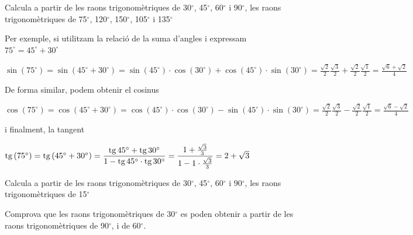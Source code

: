 \begin{mylist}
	\exer
	Calcula a partir de les raons trigonomètriques de
	30${}^\circ$, 45${}^\circ$, 60${}^\circ$ i
	90${}^\circ$, les raons trigonomètriques de
	75${}^\circ$, 120${}^\circ$, 150${}^\circ$, 
	105${}^\circ$ i 135${}^\circ$
	
	\begin{example}[*]
		Per exemple, si utilitzam la relació de la suma d'angles i expressam $75^\circ =45^\circ + 30^\circ$
		
		$\sin(75^\circ)=\sin(45^\circ + 30^\circ)=\sin(45^\circ)\cdot \cos(30^\circ) + \cos(45^\circ)\cdot \sin(30^\circ)=\frac{\sqrt{2}}{2}\frac{\sqrt{3}}{2}+\frac{\sqrt{2}}{2}\frac{\sqrt{1}}{2}=\frac{\sqrt{6}+\sqrt{2}}{4}$
	\end{example}
	
	\begin{example}[*]	
		De forma similar, podem obtenir el cosinus
		
		$\cos(75^\circ)=\cos(45^\circ + 30^\circ)=\cos(45^\circ)\cdot \cos(30^\circ) - \sin(45^\circ)\cdot \sin(30^\circ)=\frac{\sqrt{2}}{2}\frac{\sqrt{3}}{2}-\frac{\sqrt{2}}{2}\frac{\sqrt{1}}{2}=\frac{\sqrt{6}-\sqrt{2}}{4}$
		
		i finalment, la tangent
		
		$\mathrm{tg}\,(75^\circ)=\mathrm{tg}\,(45^\circ + 30^\circ)=\dfrac{\mathrm{tg}\, 45^\circ + \mathrm{tg}\, 30^\circ}{1-\mathrm{tg}\, 45^\circ \cdot \mathrm{tg}\, 30^\circ}=\dfrac{1 + \frac{\sqrt{3}}{3}}{1-1 \cdot \frac{\sqrt{3}}{3}}=2+\sqrt{3}$
	\end{example}
	
	\exer
	Calcula a partir de les raons trigonomètriques de
	30${}^\circ$, 45${}^\circ$, 60${}^\circ$ i
	90${}^\circ$, les raons trigonomètriques de
	15${}^\circ$
	
	
	\exer
	Comprova que les raons trigonomètriques de 30${}^\circ$ es
	poden obtenir a partir de les raons trigonomètriques de 90${}^\circ$, 
	i de 60${}^\circ$.
	
	

\end{mylist}
